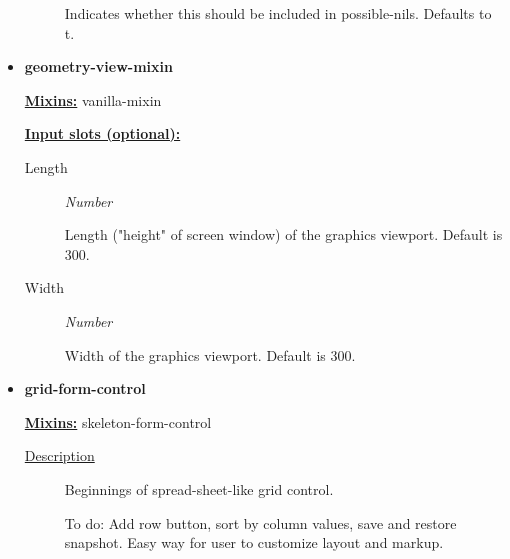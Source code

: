 \documentclass [11pt]{book}
\begin{document}
\begin{itemize}
\begin{description}
 Indicates whether this should be included in possible-nils. Defaults to t.




\end{description}







\item {}
\label{prim:geometry-view-mixin}
\textbf{geometry-view-mixin}


\textbf{
\underline{Mixins:}} vanilla-mixin











\textbf{
\underline{Input slots (optional):}}

\begin{description}

\item [Length]
\emph{Number}

 Length ("height" of screen window) of the graphics viewport. Default is 300.




\item [Width]
\emph{Number}

 Width of the graphics viewport. Default is 300.




\end{description}







\item {}
\label{prim:grid-form-control}
\textbf{grid-form-control}


\textbf{
\underline{Mixins:}} skeleton-form-control





\begin{description}

\item [
\underline{Description}]


Beginnings of spread-sheet-like 
grid control.

To do: Add row button, sort by column values, 
save and restore snapshot. Easy way for user to 
customize layout and markup.


\end{description}
\end{itemize}
\end{document}
